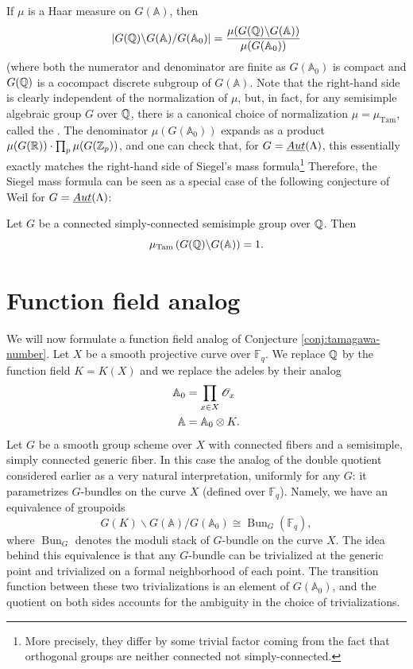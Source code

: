 \documentclass[oneside]{amsart}
\renewcommand{\A}{\mathbb{A}}
\newcommand{\muT}{\mu_{\mathrm{Tam}}}
\newcommand{\F}{\mathbb{F}}
\DeclareMathOperator{\Bun}{Bun}
\begin{document}
If $\mu$ is a Haar measure on $G(\A)$, then
\[
\left| G(\Q)\backslash G(\A) /G(\A_0) \right| = \frac{\mu(G(\Q) \backslash G(\A))}{\mu(G(\A_0))}
\] 
(where both the numerator and denominator are finite as $G(\A_0)$ is compact and $G(\mathbb Q)$ is a cocompact discrete subgroup of $G(\A)$. Note that the right-hand side is clearly independent of the normalization of $\mu$, but, in fact, for any semisimple algebraic group $G$ over $\mathbb Q$, there is a canonical choice of normalization $\mu = \muT$, called the . The denominator $\mu(G(\A_0))$ expands as a product $\mu(G(\mathbb R)) \cdot \prod_p \mu(G(\mathbb Z_p))$, and one can check that, for $G=\underline{Aut}(\Lambda)$, this essentially exactly matches the right-hand side of Siegel's mass formula\footnote{More precisely, they differ by some trivial factor coming from the fact that orthogonal groups are neither connected not simply-connected.} Therefore, the Siegel mass formula can be seen as a special case of the following conjecture of Weil for $G=\underline{Aut}(\Lambda)$:

\begin{conjecture} \label{conj:tamagawa-number}
    Let $G$ be a connected simply-connected semisimple group over $\mathbb Q$. Then
    \[ \muT\left( G(\Q) \backslash G(\A) \right) = 1.\]
\end{conjecture}

\section{Function field analog}
We will now formulate a function field analog of Conjecture \ref{conj:tamagawa-number}. Let $X$ be a smooth projective curve over $\F_q$. We replace $\mathbb Q$ by the function field $K=K(X)$ and we replace the adeles by their analog
\begin{align*}
	\A_0 &= \prod_{x\in X}\OO_x \\
	\A &= \A_0 \otimes K.
\end{align*}
Let $G$ be a smooth group scheme over $X$ with connected fibers and a semisimple, simply connected generic fiber. In this case the analog of the double quotient considered earlier as a very natural interpretation, uniformly for any $G$: it parametrizes $G$-bundles on the curve $X$ (defined over $\F_q$). Namely, we have an equivalence of groupoids
\[
G(K)\backslash G(\A) /G(\A_0) \cong \Bun_G(\F_q),
\] 
where $\Bun_G$ denotes the moduli stack of $G$-bundle on the curve $X$. The idea behind this equivalence is that any $G$-bundle can be trivialized at the generic point and trivialized on a formal neighborhood of each point. The transition function between these two trivializations is an element of $G(\A_0)$, and the quotient on both sides accounts for the ambiguity in the choice of trivializations.
\end{document}
